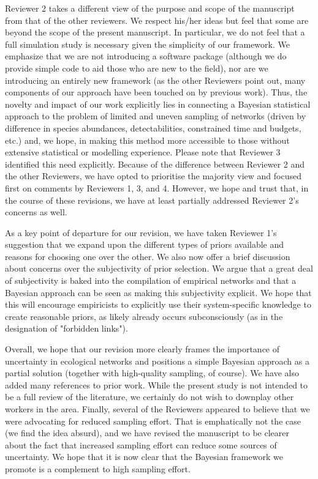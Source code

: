 \documentclass[12pt]{letter}
\begin{document}
	Reviewer 2 takes a different view of the purpose and scope of the manuscript from that of the other reviewers. We respect his/her ideas but feel that some are beyond the scope of the present manuscript. In particular, we do not feel that a full simulation study is necessary given the simplicity of our framework. We emphasize that we are not introducing a software package (although we do provide simple code to aid those who are new to the field), nor are we introducing an entirely new framework (as the other Reviewers point out, many components of our approach have been touched on by previous work). Thus, the novelty and impact of our work explicitly lies in connecting a Bayesian statistical approach to the problem of limited and uneven sampling of networks (driven by difference in species abundances, detectabilities, constrained time and budgets, etc.) and, we hope, in making this method more accessible to those without extensive statistical or modelling experience. Please note that Reviewer 3 identified this need explicitly. 
	Because of the difference between Reviewer 2 and the other Reviewers, we have opted to prioritise the majority view and focused first on comments by Reviewers 1, 3, and 4. However, we hope and trust that, in the course of these revisions, we have at least partially addressed Reviewer 2's concerns as well. 


	As a key point of departure for our revision, we have taken Reviewer 1's suggestion that we expand upon the different types of priors available and reasons for choosing one over the other. We also now offer a brief discussion about concerns over the subjectivity of prior selection. We argue that a great deal of subjectivity is baked into the compilation of empirical networks and that a Bayesian approach can be seen as making this subjectivity explicit. We hope that this will encourage empiricists to explicitly use their system-specific knowledge to create reasonable priors, as likely already occurs subconsciously (as in the designation of "forbidden links"). 


	Overall, we hope that our revision more clearly frames the importance of uncertainty in ecological networks and positions a simple Bayesian approach as a partial solution (together with high-quality sampling, of course). 
	We have also added many references to prior work. While the present study is not intended to be a full review of the literature, we certainly do not wish to downplay other workers in the area.
	Finally, several of the Reviewers appeared to believe that we were advocating for reduced sampling effort. That is emphatically not the case (we find the idea absurd), and we have revised the manuscript to be clearer about the fact that increased sampling effort can reduce some sources of uncertainty. We hope that it is now clear that the Bayesian framework we promote is a complement to high sampling effort.
\end{document}
